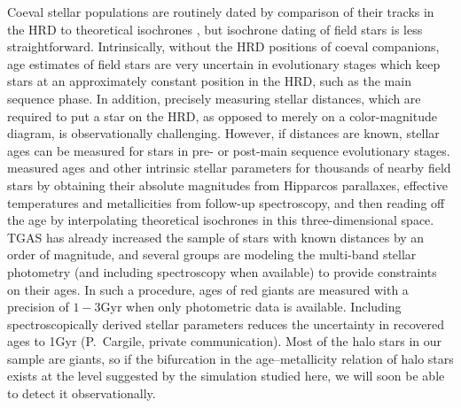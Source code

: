 \documentclass[apj, twocolappendix, numberedappendix, appendixfloats]{emulateapj}
\begin{document}
Coeval stellar populations are routinely dated by comparison of their tracks in the HRD to theoretical isochrones \citep[e.g.,][]{sandage1970, chaboyer1998, dotter2007}, but isochrone dating of field stars is less straightforward.
Intrinsically, without the HRD positions of coeval companions, age estimates of field stars are very uncertain in evolutionary stages which keep stars at an approximately constant position in the HRD, such as the main sequence phase.
In addition, precisely measuring stellar distances, which are required to put a star on the HRD, as opposed to merely on a color-magnitude diagram, is observationally challenging.
However, if distances are known, stellar ages can be measured for stars in pre- or post-main sequence evolutionary stages.
\citet{gcs} measured ages and other intrinsic stellar parameters for thousands of nearby field stars by obtaining their absolute magnitudes from Hipparcos parallaxes, effective temperatures and metallicities from follow-up spectroscopy, and then reading off the age by interpolating theoretical isochrones in this three-dimensional space.
TGAS has already increased the sample of stars with known distances by an order of magnitude, and several groups are modeling the multi-band stellar photometry (and including spectroscopy when available) to provide constraints on their ages.
In such a procedure, ages of red giants are measured with a precision of $1-3$\;Gyr when only photometric data is available.
Including spectroscopically derived stellar parameters reduces the uncertainty in recovered ages to 1\;Gyr (P.~Cargile, private communication).
Most of the halo stars in our sample are giants, so if the bifurcation in the age--metallicity relation of halo stars exists at the level suggested by the simulation studied here, we will soon be able to detect it observationally.
\end{document}
